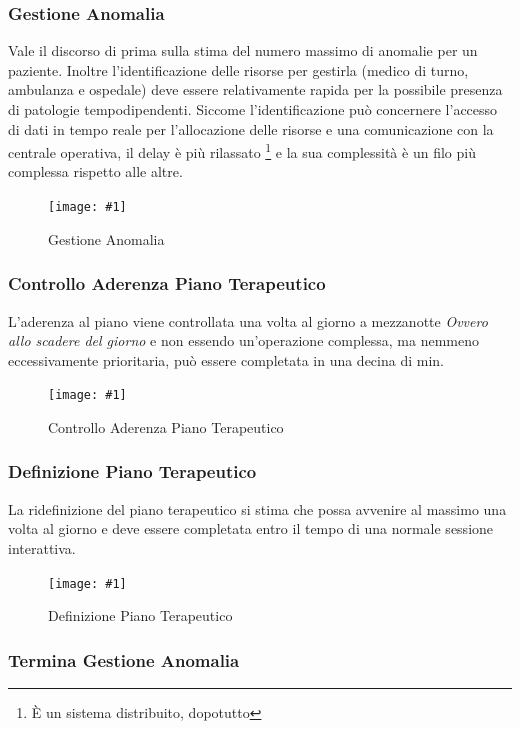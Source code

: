 \documentclass[a4paper,11pt,oneside, table]{article}
\newcommand{\putimage}[4] {
	\begin{figure}[H]
	    \centering
	    \texttt{[image: \#1]}
	    \caption{#2}\label{#3}
	\end{figure}
}
\begin{document}
\subsubsection{Gestione Anomalia}

Vale il discorso di prima sulla stima del numero massimo di anomalie per un paziente. Inoltre l'identificazione delle risorse per gestirla (medico di turno, ambulanza e ospedale) deve essere relativamente rapida per la possibile presenza di patologie tempodipendenti. Siccome l'identificazione pu\`o concernere l'accesso di dati in tempo reale per l'allocazione delle risorse e una comunicazione con la centrale operativa, il delay \`e pi\`u rilassato \footnote{\`E un sistema distribuito, dopotutto} e la sua complessit\`a \`e un filo pi\`u complessa rispetto alle altre.

\putimage{images/Diagramma delle Attivita'/Gestione Anomalia.png}{Gestione Anomalia}{png:act:gestione-anomalia}{1}

\subsubsection{Controllo Aderenza Piano Terapeutico}

L'aderenza al piano viene controllata una volta al giorno a mezzanotte \textit{Ovvero allo scadere del giorno} e non essendo un'operazione complessa, ma nemmeno eccessivamente prioritaria, pu\`o essere completata in una decina di min.

\putimage{images/Diagramma delle Attivita'/Controllo Aderenza Piano Terapeutico.png}{Controllo Aderenza Piano Terapeutico}{png:act:controllo-aderenza-piano-terapeutico}{1}

\subsubsection{Definizione Piano Terapeutico}

La ridefinizione del piano terapeutico si stima che possa avvenire al massimo una volta al giorno e deve essere completata entro il tempo di una normale sessione interattiva.

\putimage{images/Diagramma delle Attivita'/Definizione Piano Terapeutico.png}{Definizione Piano Terapeutico}{png:act:definizione-piano-terapeutico}{1}

\subsubsection{Termina Gestione Anomalia}
\end{document}
